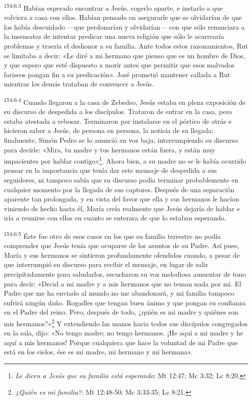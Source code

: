 \par 
\textsuperscript{154:6.3} Habían esperado encontrar a Jesús, cogerlo aparte, e instarlo a que volviera a casa con ellos. Habían pensado en asegurarle que se olvidarían de que los había descuidado ---que perdonarían y olvidarían--- con que sólo renunciara a la insensatez de intentar predicar una nueva religión que sólo le acarrearía problemas y traería el deshonor a su familia. Ante todos estos razonamientos, Rut se limitaba a decir: «Le diré a mi hermano que pienso que es un hombre de Dios, y que espero que esté dispuesto a morir antes que permitir que esos malvados fariseos pongan fin a su predicación». José prometió mantener callada a Rut mientras los demás trataban de convencer a Jesús.

\par 
\textsuperscript{154:6.4} Cuando llegaron a la casa de Zebedeo, Jesús estaba en plena exposición de su discurso de despedida a los discípulos. Trataron de entrar en la casa, pero estaba atestada a rebosar. Terminaron por instalarse en el pórtico de atrás e hicieron saber a Jesús, de persona en persona, la noticia de su llegada; finalmente, Simón Pedro se lo anunció en voz baja, interrumpiendo su discurso para decirle: «Mira, tu madre y tus hermanos están fuera, y están muy impacientes por hablar contigo»\footnote{\textit{Le dicen a Jesús que su familia está esperando}: Mt 12:47; Mc 3:32; Lc 8:20.}. Ahora bien, a su madre no se le había ocurrido pensar en la importancia que tenía dar este mensaje de despedida a sus seguidores, ni tampoco sabía que su discurso podía terminar probablemente en cualquier momento por la llegada de sus captores. Después de una separación aparente tan prolongada, y en vista del favor que ella y sus hermanos le hacían viniendo de hecho hasta él, María creía realmente que Jesús dejaría de hablar e iría a reunirse con ellos en cuanto se enterara de que lo estaban esperando.

\par 
\textsuperscript{154:6.5} Éste fue otro de esos casos en los que su familia terrestre no podía comprender que Jesús tenía que ocuparse de los asuntos de su Padre. Así pues, María y sus hermanos se sintieron profundamente ofendidos cuando, a pesar de que interrumpió su discurso para recibir el mensaje, en lugar de salir precipitadamente para saludarlos, escucharon su voz melodiosa aumentar de tono para decir: «Decid a mi madre y a mis hermanos que no teman nada por mí. El Padre que me ha enviado al mundo no me abandonará, y mi familia tampoco sufrirá ningún daño. Rogadles que tengan buen ánimo y que pongan su confianza en el Padre del reino. Pero, después de todo, ¿quién es mi madre y quiénes son mis hermanos?»\footnote{\textit{¿Quién es mi familia?}: Mt 12:48-50; Mc 3:33-35; Lc 8:21.} Y extendiendo las manos hacia todos sus discípulos congregados en la sala, dijo: «No tengo madre; no tengo hermanos. ¡He aquí a mi madre y he aquí a mis hermanos! Porque cualquiera que hace la voluntad de mi Padre que está en los cielos, ése es mi madre, mi hermano y mi hermana».


